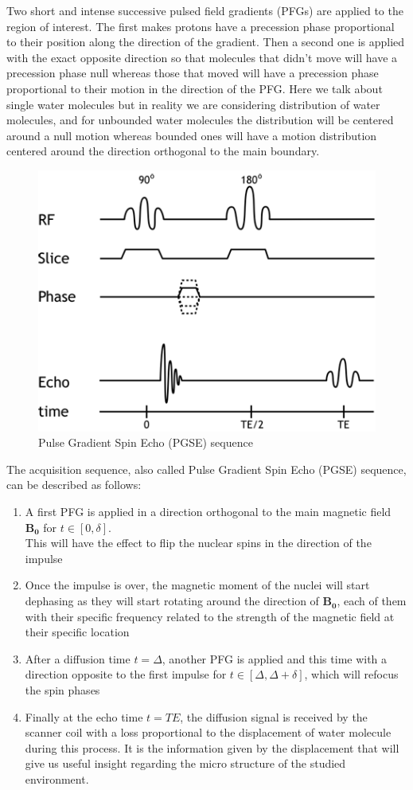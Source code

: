 Two short and intense successive pulsed field gradients (PFGs) are applied to the region of interest. The first makes protons have a precession phase proportional to their position along the direction of the gradient. Then a second one is applied with the exact opposite direction so that molecules that didn't move will have a precession phase null whereas those that moved will have a precession phase proportional to their motion in the direction of the PFG. Here we talk about single water molecules but in reality we are considering distribution of water molecules, and for unbounded water molecules the distribution will be centered around a null motion whereas bounded ones will have a motion distribution centered around the direction orthogonal to the main boundary.
\begin{figure}
    \centering
    \includegraphics[width=.5\textwidth]{figures/pgse}
    \caption{Pulse Gradient Spin Echo (PGSE) sequence}
    \label{fig:pgse}
\end{figure}

The acquisition sequence, also called Pulse Gradient Spin Echo (PGSE) sequence, can be described as follows: \cite{assemlal2011recent}
\begin{enumerate}
    \item A first PFG is applied in a direction orthogonal to the main magnetic field $\mathbf{B_0}$ for $t \in [0, \delta]$.\\
    This will have the effect to flip the nuclear spins in the direction of the impulse
    \item Once the impulse is over, the magnetic moment of the nuclei will start dephasing as they will start rotating around the direction of $\mathbf{B_0}$, each of them with their specific frequency related to the strength of the magnetic field at their specific location
    \item After a diffusion time $t = \Delta$, another PFG is applied and this time with a direction opposite to the first impulse for $t \in [\Delta, \Delta + \delta]$, which will refocus the spin phases
    \item Finally at the echo time $t = TE$, the diffusion signal is received by the scanner coil with a loss proportional to the displacement of water molecule during this process. It is the information given by the displacement that will give us useful insight regarding the micro structure of the studied environment.
\end{enumerate}

